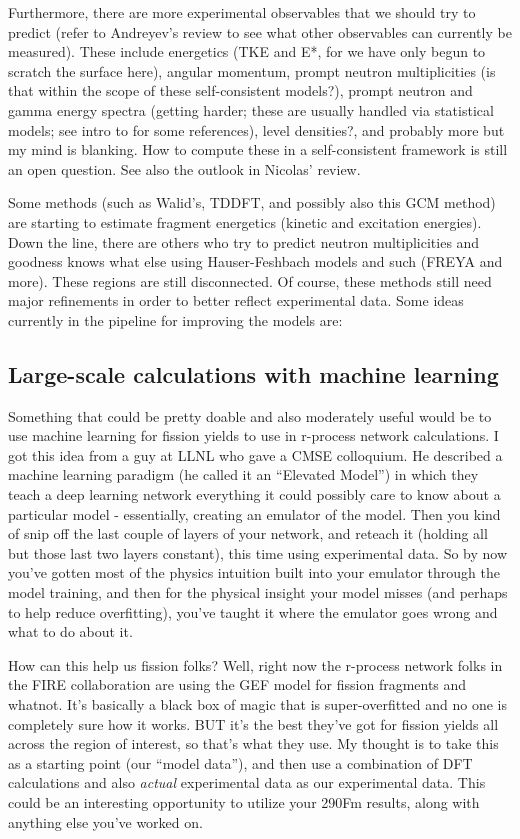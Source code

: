 Furthermore, there are more experimental observables that we should try to predict (refer to Andreyev's review to see what other observables can currently be measured). These include energetics (TKE and E*, for we have only begun to scratch the surface here), angular momentum, prompt neutron multiplicities (is that within the scope of these self-consistent models?), prompt neutron and gamma energy spectra (getting harder; these are usually handled via statistical models; see intro to \cite{Schmidt2018} for some references), level densities?, and probably more but my mind is blanking. How to compute these in a self-consistent framework is still an open question. See also the outlook in Nicolas' review.

Some methods (such as Walid's, TDDFT, and possibly also this GCM method) are starting to estimate fragment energetics (kinetic and excitation energies). Down the line, there are others who try to predict neutron multiplicities and goodness knows what else using Hauser-Feshbach models and such (FREYA and more). These regions are still disconnected. Of course, these methods still need major refinements in order to better reflect experimental data. Some ideas currently in the pipeline for improving the models are:

\subsection{Large-scale calculations with machine learning}
Something that could be pretty doable and also moderately useful would be to use machine learning for fission yields to use in r-process network calculations. I got this idea from a guy at LLNL who gave a CMSE colloquium. He described a machine learning paradigm (he called it an ``Elevated Model'') in which they teach a deep learning network everything it could possibly care to know about a particular model - essentially, creating an emulator of the model. Then you kind of snip off the last couple of layers of your network, and reteach it (holding all but those last two layers constant), this time using experimental data. So by now you've gotten most of the physics intuition built into your emulator through the model training, and then for the physical insight your model misses (and perhaps to help reduce overfitting), you've taught it where the emulator goes wrong and what to do about it.

How can this help us fission folks? Well, right now the r-process network folks in the FIRE collaboration are using the GEF model for fission fragments and whatnot. It's basically a black box of magic that is super-overfitted and no one is completely sure how it works. BUT it's the best they've got for fission yields all across the region of interest, so that's what they use. My thought is to take this as a starting point (our ``model data''), and then use a combination of DFT calculations and also \textit{actual} experimental data as our experimental data. This could be an interesting opportunity to utilize your 290Fm results, along with anything else you've worked on.

